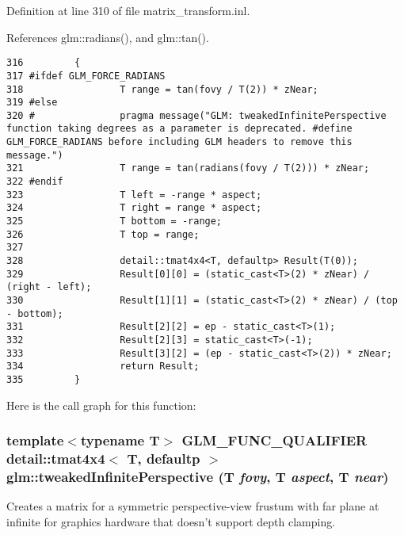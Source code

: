 Definition at line 310 of file matrix\_\-transform.inl.

References glm::radians(), and glm::tan().

\begin{Code}\begin{verbatim}316         {
317 #ifdef GLM_FORCE_RADIANS
318                 T range = tan(fovy / T(2)) * zNear;     
319 #else
320 #               pragma message("GLM: tweakedInfinitePerspective function taking degrees as a parameter is deprecated. #define GLM_FORCE_RADIANS before including GLM headers to remove this message.")
321                 T range = tan(radians(fovy / T(2))) * zNear;    
322 #endif
323                 T left = -range * aspect;
324                 T right = range * aspect;
325                 T bottom = -range;
326                 T top = range;
327 
328                 detail::tmat4x4<T, defaultp> Result(T(0));
329                 Result[0][0] = (static_cast<T>(2) * zNear) / (right - left);
330                 Result[1][1] = (static_cast<T>(2) * zNear) / (top - bottom);
331                 Result[2][2] = ep - static_cast<T>(1);
332                 Result[2][3] = static_cast<T>(-1);
333                 Result[3][2] = (ep - static_cast<T>(2)) * zNear;
334                 return Result;
335         }
\end{verbatim}
\end{Code}




Here is the call graph for this function:\hypertarget{group__gtc__matrix__transform_ge918d92c6d1fc5c0f97ac96d66e90b6a}{
\subsubsection[tweakedInfinitePerspective]{\setlength{\rightskip}{0pt plus 5cm}template$<$typename T$>$ GLM\_\-FUNC\_\-QUALIFIER detail::tmat4x4$<$ T, defaultp $>$ glm::tweakedInfinitePerspective (T {\em fovy}, \/  T {\em aspect}, \/  T {\em near})}}
\label{group__gtc__matrix__transform_ge918d92c6d1fc5c0f97ac96d66e90b6a}


Creates a matrix for a symmetric perspective-view frustum with far plane at infinite for graphics hardware that doesn't support depth clamping.

